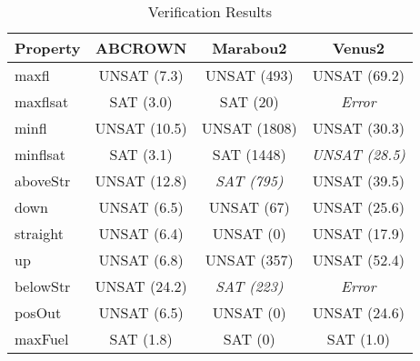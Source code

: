 \begin{table} [htb]
	\centering
  	\caption{Verification Results} \label{tab:results}
	\begin{tabular}{|l | c| c| c|}
		\hline
		Property & ABCROWN  & Marabou2  & Venus2 \\
		\hline
		maxfl 		& UNSAT (7.3)  	& UNSAT (493) 	& UNSAT (69.2)   \\
		\hline
		maxflsat 	& SAT (3.0) 		& SAT (20) 		& \emph{Error} \\
		\hline
		minfl 		& UNSAT (10.5) 	& UNSAT (1808) 	& UNSAT (30.3)  \\
		\hline
		minflsat 	& SAT (3.1) 		& SAT (1448) 		& \emph{UNSAT (28.5)} \\
		\hline
		aboveStr 	& UNSAT (12.8) 	&\emph{SAT (795)}		& UNSAT (39.5)\\
		\hline
		down 		& UNSAT (6.5) 	& UNSAT (67) 		& UNSAT (25.6) \\
		\hline
		straight 	& UNSAT (6.4) 	& UNSAT (0) 		& UNSAT (17.9) \\
		\hline
		up 			& UNSAT (6.8) 	& UNSAT (357) 	& UNSAT (52.4)  \\
		\hline
		belowStr 	& UNSAT (24.2) 	& \emph{SAT (223)} 		&\emph{Error} \\
		\hline
		posOut 	& UNSAT (6.5) 	& UNSAT (0) 		& UNSAT (24.6) \\
		\hline
		maxFuel 	& SAT (1.8) 		& SAT (0) 		& SAT (1.0) \\
		\hline
	\end{tabular}


\end{table}

